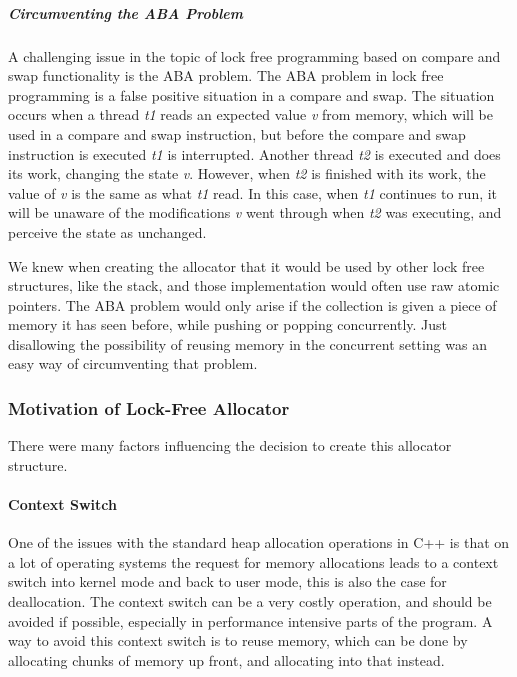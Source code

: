 \subparagraph{Circumventing the ABA Problem}
\label{subpar:detailed_lock_free_allocator_aba}
A challenging issue in the topic of lock free programming based on compare and swap functionality is the ABA problem.
The ABA problem in lock free programming is a false positive situation in a compare and swap\cite{understanding_and_preventing_aba_problem}.
The situation occurs when a thread \textit{t1} reads an expected value \textit{v} from memory,
which will be used in a compare and swap instruction, but before
the compare and swap instruction is executed \textit{t1} is interrupted.
Another thread \textit{t2} is executed and does its work, changing the state \textit{v}.
However, when \textit{t2} is finished with its work, the value of \textit{v} is the same as what \textit{t1} read.
In this case, when \textit{t1} continues to run, it will be unaware of the modifications \textit{v} went through
when \textit{t2} was executing, and perceive the state as unchanged.

We knew when creating the allocator that it would be used by other lock free structures,
like the stack, and those implementation would often use raw atomic pointers.
The ABA problem would only arise if the collection is given a piece of memory
it has seen before, while pushing or popping concurrently.
Just disallowing the possibility of reusing memory in the concurrent setting was an easy way of circumventing that
problem.

\subsubsection{Motivation of Lock-Free Allocator}
There were many factors influencing the decision to create this allocator structure.

\paragraph{Context Switch}
One of the issues with the standard heap allocation operations in C++ is that
on a lot of operating systems the request for memory allocations leads to a context switch into
kernel mode and back to user mode, this is also the case for deallocation.
The context switch can be a very costly operation, and should be avoided
if possible, especially in performance intensive parts of the program\cite[p. 240]{game_engine_architecture}.
A way to avoid this context switch is to reuse memory, which can be done by allocating
chunks of memory up front, and allocating into that instead.

